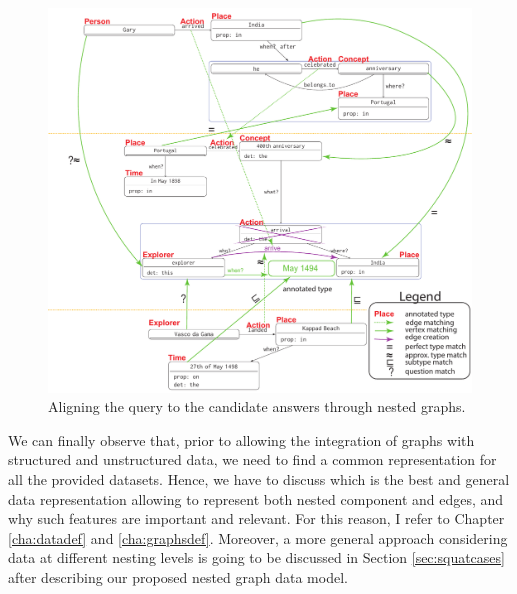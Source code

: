 \begin{figure}
	\centering
	\includegraphics[width=.8\textheight]{fig/01dataint/GraphAlignWatson.pdf}
	\caption{Aligning the query to the candidate answers through nested graphs.}
	\label{fig:aligninggraphs}
\end{figure}

We can finally observe that, prior to allowing the integration of graphs with structured and unstructured data, we need to find a common representation for all the provided datasets. Hence, we have to discuss which is the best and general data representation allowing to represent both nested component and edges, and why such features are important and relevant. For this reason, I refer to Chapter \vref{cha:datadef} and \vref{cha:graphsdef}. Moreover, a more general approach considering data at different nesting levels is going to be discussed in Section \vref{sec:squatcases} after describing our proposed nested graph data model.

